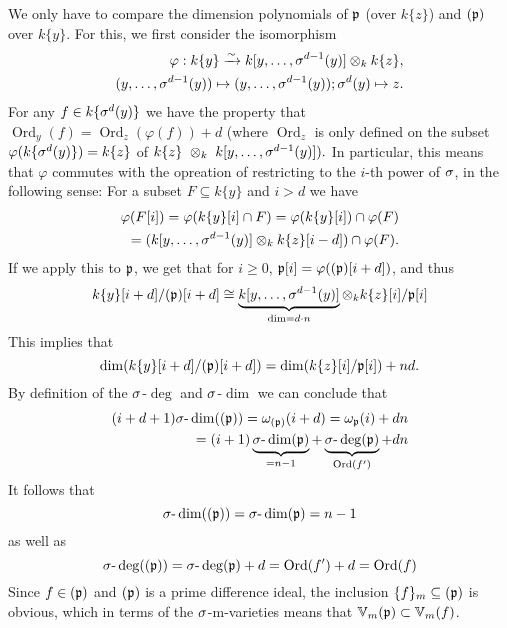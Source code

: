 \begin{cor}
\begin{bew}
We only have to compare the dimension polynomials of $\mathfrak{p}$ (over $k\{z\}$) and $(\mathfrak{p})$ over $k\{y\}$.
For this, we first consider the isomorphism
\begin{align*} \varphi: k\{y\} \xrightarrow{\sim} k[y,\ldots,\sigma^{d-1}(y)] \otimes_k k\{z\}, \\ (y,\ldots,\sigma^{d-1}(y)) \mapsto (y,\ldots,\sigma^{d-1}(y)); \sigma^d(y) \mapsto z. \end{align*}
For any $f \in k\{\sigma^{d}(y)\}$ we have the property that $\operatorname{Ord}_y(f) = \operatorname{Ord}_z(\varphi(f)) + d$ (where $\operatorname{Ord}_z$ is only defined on the subset $\varphi(k\{\sigma^d(y)\}) = k\{z\}$ of $k\{z\}~\otimes_k~k[y,\ldots,\sigma^{d-1}(y)]).$
In particular, this means that $\varphi$ commutes with the opreation of restricting to the $i$-th power of $\sigma$, in the following sense:
For a subset $F \subseteq k\{y\}$ and $i > d$ we have
\begin{align*} \varphi(F[i]) = \varphi(k\{y\}[i] \cap F) = \varphi(k\{y\}[i]) \cap \varphi(F) \\
 = (k[y,\ldots,\sigma^{d-1}(y)] \otimes_k k\{z\}[i-d]) \cap \varphi(F) .\end{align*}
If we apply this to $\mathfrak{p}$, we get that for $i\geq 0$, $\mathfrak{p}[i] = \varphi((\mathfrak{p})[i+d])$, and thus 
$$ k\{y\}[i+d]/(\mathfrak{p})[i+d] \cong \underbrace{k[y,\ldots,\sigma^{d-1}(y)]}_{ \text{dim} = d \cdot n} \otimes_k k\{z\}[i]/\mathfrak{p}[i]$$
This implies that 
$$\operatorname{dim}(k\{y\}[i+d]/(\mathfrak{p})[i+d]) = \operatorname{dim}(k\{z\}[i]/\mathfrak{p}[i]) + nd.$$
By definition of the $\sigma$-$\operatorname{deg}$ and $\sigma$-$\operatorname{dim}$ we can conclude that 
\begin{align*}
(i+d+1) \sigma\text{-}\operatorname{dim}( (\mathfrak{p}) ) = \omega_{(\mathfrak{p})}(i+d) = \omega_{\mathfrak{p}}(i) + dn \\
= (i+1) \underbrace{\sigma\text{-}\operatorname{dim}(\mathfrak{p})}_{ = n - 1} + \underbrace{\sigma\text{-}\operatorname{deg}(\mathfrak{p})}_{\operatorname{Ord}(f')} + dn
\end{align*}
It follows that 
$$\sigma\text{-}\operatorname{dim}((\mathfrak{p}))= \sigma\text{-}\operatorname{dim}(\mathfrak{p}) = n-1 $$
as well as
$$\sigma\text{-}\operatorname{deg}((\mathfrak{p}))= \sigma\text{-}\operatorname{deg}(\mathfrak{p}) + d = \operatorname{Ord}(f') + d = \operatorname{Ord}(f)$$
Since $f \in (\mathfrak{p})$ and $(\mathfrak{p})$ is a prime difference ideal, the inclusion $\{f\}_m \subseteq (\mathfrak{p})$ is obvious, which in terms of the $\sigma$-m-varieties means that $\mathbb{V}_m(\mathfrak{p}) \subset \mathbb{V}_m(f)$. 

\end{bew}
\end{cor}

